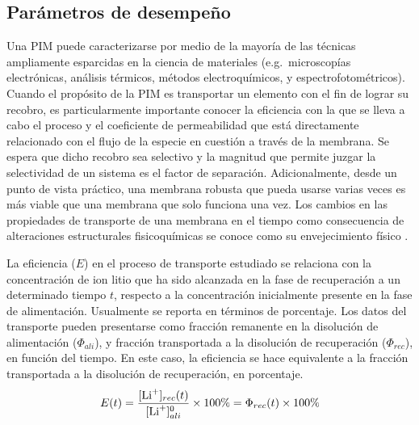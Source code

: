 
\subsection{Parámetros de desempeño}\label{sec:performanceparameters}
Una PIM puede caracterizarse por medio de la mayoría de las técnicas ampliamente esparcidas en la ciencia de materiales (e.g.\ microscopías electrónicas, análisis térmicos, métodos electroquímicos, y espectrofotométricos). Cuando el propósito de la \ac{PIM} es transportar un elemento con el fin de lograr su recobro, es particularmente importante conocer la eficiencia con la que se lleva a cabo el proceso y el coeficiente de permeabilidad que está directamente relacionado con el flujo de la especie en cuestión a través de la membrana. Se espera que dicho recobro sea selectivo y la magnitud que permite juzgar la selectividad de un sistema es el factor de separación. Adicionalmente, desde un punto de vista práctico, una membrana robusta que pueda usarse varias veces es más viable que una membrana que solo funciona una vez. Los cambios en las propiedades de transporte de una membrana en el tiempo como consecuencia de alteraciones estructurales fisicoquímicas se conoce como su envejecimiento físico \citep{Koros}.

La eficiencia ($E$) en el proceso de transporte estudiado se relaciona con la concentración de ion litio que ha sido alcanzada en la fase de recuperación a un determinado tiempo $t$, respecto a la concentración inicialmente presente en la fase de alimentación. Usualmente se reporta en términos de porcentaje. Los datos del transporte pueden presentarse como fracción remanente en la disolución de alimentación ($\Phi_{ali}$), y fracción transportada a la disolución de recuperación ($\Phi_{rec}$), en función del tiempo. En este caso, la eficiencia se hace equivalente a la fracción transportada a la disolución de recuperación, en porcentaje.
\begin{equation}\label{eq:efi}
    E(t)=\frac{[\ce{Li^+}]_{rec}(t)}{[\ce{Li^+}]_{ali}^0}\times100\% = \Phi_{rec}(t)\times100\%
\end{equation}

